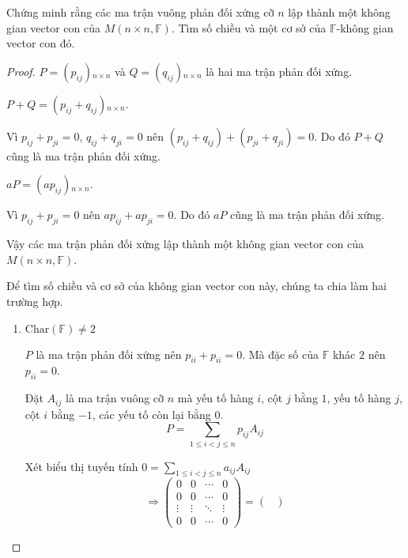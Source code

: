 \documentclass[class=linearalgebra,crop=false]{standalone}
\begin{document}
\begin{exercise}Chứng minh rằng các ma trận vuông phản đối xứng cỡ $n$ lập thành một không gian vector con của $M(n\times n,\mathbb{F})$. Tìm số chiều và một cơ sở của $\mathbb{F}$-không gian vector con đó.
\end{exercise}

\begin{proof}$P = (p_{ij}){}_{n\times n}$ và $Q = (q_{ij}){}_{n\times n}$ là hai ma trận phản đối xứng.
    \par $P + Q = (p_{ij} + q_{ij}){}_{n\times n}$.
    \par Vì $p_{ij} + p_{ji} = 0$, $q_{ij} + q_{ji} = 0$ nên $(p_{ij} + q_{ij}) + (p_{ji} + q_{ji}) = 0$. Do đó $P + Q$ cũng là ma trận phản đối xứng.
    \par $aP = (ap_{ij}){}_{n\times n}$.
    \par Vì $p_{ij} + p_{ji} = 0$ nên $ap_{ij} + ap_{ji} = 0$. Do đó $aP$ cũng là ma trận phản đối xứng.
    \par Vậy các ma trận phản đối xứng lập thành một không gian vector con của $M(n\times n,\mathbb{F})$.
    \par Để tìm số chiều và cơ sở của không gian vector con này, chúng ta chia làm hai trường hợp.
    \begin{enumerate}
        \item $\text{Char}(\mathbb{F})\ne 2$
              \par $P$ là ma trận phản đối xứng nên $p_{ii} + p_{ii} = 0$. Mà đặc số của $\mathbb{F}$ khác $2$ nên $p_{ii} = 0$.
              \par Đặt $A_{ij}$ là ma trận vuông cỡ $n$ mà yếu tố hàng $i$, cột $j$ bằng $1$, yếu tố hàng $j$, cột $i$ bằng $-1$, các yếu tố còn lại bằng $0$.
              \[ P = \sum_{1\le i < j \le n}p_{ij}A_{ij} \]
              \par Xét biểu thị tuyến tính $0 = \displaystyle\sum_{1\le i < j\le n}a_{ij}A_{ij}$
              \[
                  \Rightarrow
                  \begin{pmatrix}
                      0      & 0      & \cdots & 0      \\
                      0      & 0      & \cdots & 0      \\
                      \vdots & \vdots & \ddots & \vdots \\
                      0      & 0      & \cdots & 0
                  \end{pmatrix} =
                  \begin{pmatrix}

\end{pmatrix}\]
\end{enumerate}
\end{proof}
\end{document}
